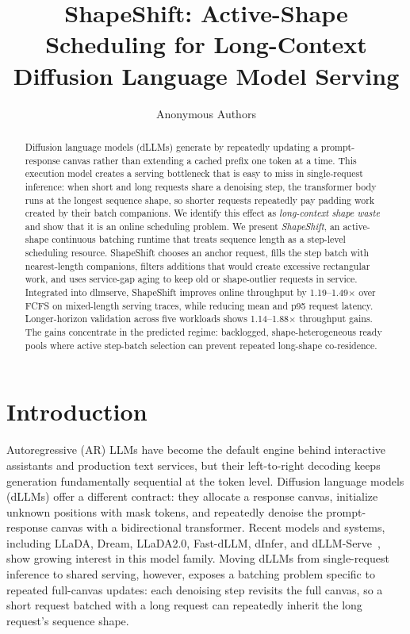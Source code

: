 \documentclass[letterpaper]{article} \usepackage[submission]{aaai2027} \usepackage[hyphens]{url} \usepackage{graphicx} \usepackage{subcaption} \urlstyle{rm} \def\UrlFont{\rm} \usepackage{natbib} \usepackage{amsmath} \usepackage{amssymb} \usepackage{booktabs} \usepackage{multirow} \usepackage{algorithm} \usepackage{algorithmic}
\title{ShapeShift: Active-Shape Scheduling for Long-Context Diffusion Language Model Serving}
\author{Anonymous Authors}
\begin{document}
\maketitle

\begin{abstract}
Diffusion language models (dLLMs) generate by repeatedly updating a prompt-response canvas rather than extending a cached prefix one token at a time. This execution model creates a serving bottleneck that is easy to miss in single-request inference: when short and long requests share a denoising step, the transformer body runs at the longest sequence shape, so shorter requests repeatedly pay padding work created by their batch companions. We identify this effect as \emph{long-context shape waste} and show that it is an online scheduling problem. We present \emph{ShapeShift}, an active-shape continuous batching runtime that treats sequence length as a step-level scheduling resource. ShapeShift chooses an anchor request, fills the step batch with nearest-length companions, filters additions that would create excessive rectangular work, and uses service-gap aging to keep old or shape-outlier requests in service. Integrated into dlmserve, ShapeShift improves online throughput by 1.19--1.49$\times$ over FCFS on mixed-length serving traces, while reducing mean and p95 request latency. Longer-horizon validation across five workloads shows 1.14--1.88$\times$ throughput gains. The gains concentrate in the predicted regime: backlogged, shape-heterogeneous ready pools where active step-batch selection can prevent repeated long-shape co-residence.
\end{abstract}

\section{Introduction}

Autoregressive (AR) LLMs have become the default engine behind interactive assistants and production text services, but their left-to-right decoding keeps generation fundamentally sequential at the token level. Diffusion language models (dLLMs) offer a different contract: they allocate a response canvas, initialize unknown positions with mask tokens, and repeatedly denoise the prompt-response canvas with a bidirectional transformer. Recent models and systems, including LLaDA, Dream, LLaDA2.0, Fast-dLLM, dInfer, and dLLM-Serve~\cite{nie2025llada,dream2025,llada20_2025,zhao2025fastdllm,dInfer2025,dllmserve2025}, show growing interest in this model family. Moving dLLMs from single-request inference to shared serving, however, exposes a batching problem specific to repeated full-canvas updates: each denoising step revisits the full canvas, so a short request batched with a long request can repeatedly inherit the long request's sequence shape.
\end{document}
